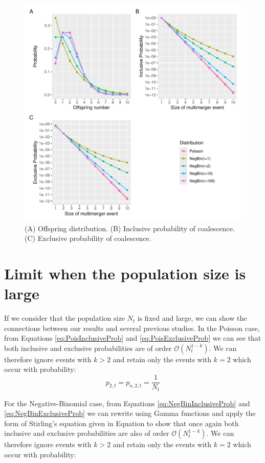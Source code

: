 \documentclass{article}
\renewcommand{\eqref}[1]{\ref{#1}}
\begin{document}
\begin{figure}[!p]
\begin{center}
\includegraphics[width=15cm]{../run/figureNegBin.pdf}
\end{center}
\caption{(A) Offspring distribution. (B) Inclusive probability of coalescence. (C) Exclusive probability of coalescence.
\label{fig:negbin}}
\end{figure}

\section{Limit when the population size is large}

If we consider that the population size $N_t$ is fixed and large, we can show the connections
between our results and several previous studies.
In the Poisson case, from Equations \eqref{eq:PoisInclusiveProb} and \eqref{eq:PoisExclusiveProb} we can see that both inclusive and exclusive probabilities
are of order $\mathcal{O}(N_t^{1-k})$. We can therefore ignore events with $k>2$
and retain only the events with $k=2$ which occur with probability:
\begin{equation}
p_{2,t}=p_{n,2,t}=\frac{1}{N_t}\label{eq:poissonapprox}
\end{equation}

For the Negative-Binomial case, from Equations \eqref{eq:NegBinInclusiveProb} and \eqref{eq:NegBinExclusiveProb} we can rewrite using Gamma functions and apply the 
form of Stirling's equation given in Equation  to show that 
once again both inclusive and exclusive probabilities are also of order $\mathcal{O}(N_t^{1-k})$. 
We can therefore ignore events with $k>2$
and retain only the events with $k=2$ which occur with probability:
\end{document}
